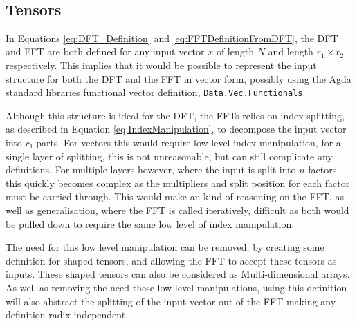 \begin{AgdaMultiCode}
\begin{code}
\\
%
\>[6]%
\>[17]\AgdaSymbol{:}\AgdaSpace{}%
\AgdaSpace{}%
\AgdaSpace{}%
\AgdaSymbol{(}\AgdaSpace{}%
\AgdaSpace{}%
\AgdaSymbol{)}%
\>[43]\AgdaSpace{}%
\AgdaSymbol{(}\AgdaSpace{}%
\AgdaSpace{}%
\AgdaSymbol{)}\AgdaSpace{}%
\AgdaOperator{\AgdaField{*}}\AgdaSpace{}%
\AgdaSymbol{(}\AgdaSpace{}%
\AgdaSpace{}%
\AgdaSymbol{)}\<%
\end{code}
\end{AgdaMultiCode}


\subsection{Tensors}
In Equations \ref{eq:DFT_Definition} and \ref{eq:FFTDefinitionFromDFT}, the DFT 
and FFT are both defined for any input vector $x$ of length $N$ and length 
$r_1\times r_2$ respectively. 
This implies that it would be possible to represent the input structure for both 
the DFT and the FFT in vector form, possibly using the Agda standard libraries functional
vector definition, \verb|Data.Vec.Functionals|.

Although this structure is ideal for the DFT, the FFTs relies on index splitting,
as described in Equation \ref{eq:IndexManipulation}, to decompose the input vector
into $r₁$ parts.
For vectors this would require low level index manipulation, for a single layer 
of splitting, this is not unreasonable, but can still complicate any definitions.
For multiple layers however, where the input is split into $n$ factors, this quickly
becomes complex as the multipliers and split position for each factor must be carried
through.
This would make an kind of reasoning on the FFT, as well as generalisation,
where the FFT is called iteratively, difficult as both would be
pulled down to require the same low level of index manipulation.

The need for this low level manipulation can be removed, by creating some
definition for shaped tensors, and allowing the FFT to 
accept these tensors as inputs.
These shaped tensors can also be considered as Multi-dimensional arrays.
As well as removing the need these low level manipulations, using this definition 
will also abstract the splitting of the input vector out of the FFT making any    %
definition radix independent.

